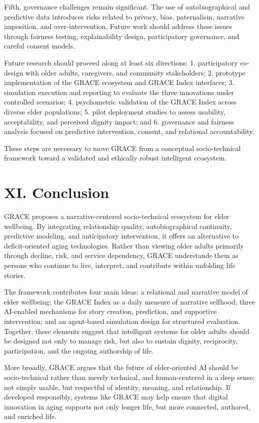 \documentclass[
  journal,
]{IEEEtran}%
\begin{document}
Fifth, governance challenges remain significant. The use of
autobiographical and predictive data introduces risks related to
privacy, bias, paternalism, narrative imposition, and over-intervention.
Future work should address these issues through fairness testing,
explainability design, participatory governance, and careful consent
models.

Future research should proceed along at least six directions: 1.
participatory co-design with older adults, caregivers, and community
stakeholders; 2. prototype implementation of the GRACE ecosystem and
GRACE Index interfaces; 3. simulation execution and reporting to
evaluate the three innovations under controlled scenarios; 4.
psychometric validation of the GRACE Index across diverse elder
populations; 5. pilot deployment studies to assess usability,
acceptability, and perceived dignity impact; and 6. governance and
fairness analysis focused on predictive intervention, consent, and
relational accountability.

These steps are necessary to move GRACE from a conceptual
socio-technical framework toward a validated and ethically robust
intelligent ecosystem.

\section{XI. Conclusion}\label{xi.-conclusion}

GRACE proposes a narrative-centered socio-technical ecosystem for elder
wellbeing. By integrating relationship quality, autobiographical
continuity, predictive modeling, and anticipatory intervention, it
offers an alternative to deficit-oriented aging technologies. Rather
than viewing older adults primarily through decline, risk, and service
dependency, GRACE understands them as persons who continue to live,
interpret, and contribute within unfolding life stories.

The framework contributes four main ideas: a relational and narrative
model of elder wellbeing; the GRACE Index as a daily measure of
narrative selfhood; three AI-enabled mechanisms for story creation,
prediction, and supportive intervention; and an agent-based simulation
design for structured evaluation. Together, these elements suggest that
intelligent systems for older adults should be designed not only to
manage risk, but also to sustain dignity, reciprocity, participation,
and the ongoing authorship of life.

More broadly, GRACE argues that the future of elder-oriented AI should
be socio-technical rather than merely technical, and human-centered in a
deep sense: not simply usable, but respectful of identity, meaning, and
relationship. If developed responsibly, systems like GRACE may help
ensure that digital innovation in aging supports not only longer life,
but more connected, authored, and enriched life.
\end{document}
